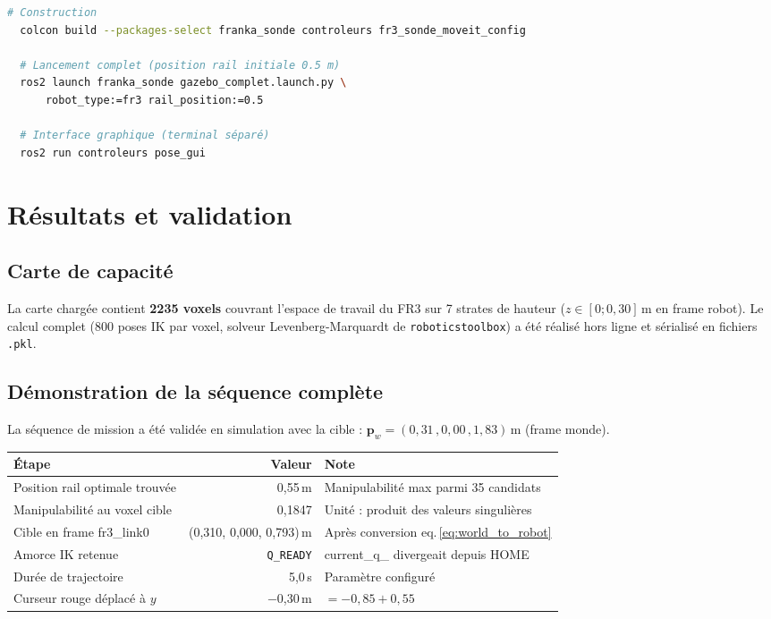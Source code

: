 \documentclass[11pt, a4paper]{article}
\begin{document}
\begin{lstlisting}[language=bash, numbers=none]
  # Construction
  colcon build --packages-select franka_sonde controleurs fr3_sonde_moveit_config

  # Lancement complet (position rail initiale 0.5 m)
  ros2 launch franka_sonde gazebo_complet.launch.py \
      robot_type:=fr3 rail_position:=0.5

  # Interface graphique (terminal séparé)
  ros2 run controleurs pose_gui
\end{lstlisting}

\section{Résultats et validation}

\subsection{Carte de capacité}

La carte chargée contient \textbf{2235 voxels} couvrant l'espace de travail du FR3 sur 7 strates de hauteur ($z \in [0; 0{,}30]$\,m en frame robot). Le calcul complet (800 poses IK par voxel, solveur Levenberg-Marquardt de \texttt{roboticstoolbox}) a été réalisé hors ligne et sérialisé en fichiers \texttt{.pkl}.

\subsection{Démonstration de la séquence complète}

La séquence de mission a été validée en simulation avec la cible :
$\mathbf{p}_w = (0{,}31\,, 0{,}00\,, 1{,}83)$\,m (frame monde).

\begin{center}
\begin{tabular}{lrl}
  \toprule
  \rowcolor{LightTeal}
  \textbf{Étape} & \textbf{Valeur} & \textbf{Note} \\
  \midrule
  Position rail optimale trouvée & 0,55\,m       & Manipulabilité max parmi 35 candidats \\
  Manipulabilité au voxel cible  & 0,1847        & Unité : produit des valeurs singulières \\
  Cible en frame fr3\_link0      & (0,310, 0,000, 0,793)\,m & Après conversion eq.\,\eqref{eq:world_to_robot} \\
  Amorce IK retenue              & \texttt{Q\_READY} & current\_q\_ divergeait depuis HOME \\
  Durée de trajectoire           & 5,0\,s        & Paramètre configuré \\
  Curseur rouge déplacé à $y$    & −0,30\,m      & $= -0{,}85 + 0{,}55$ \\
  \bottomrule
\end{tabular}
\end{center}
\end{document}
